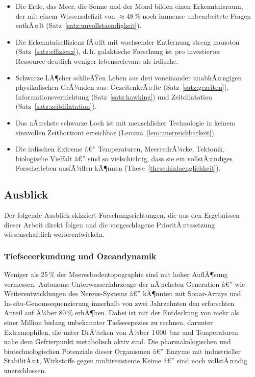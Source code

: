 ﻿\documentclass[a4paper,12pt]{article}
\theoremstyle{definition}
\begin{document}
\begin{itemize}
    \item Die Erde, das Meer, die Sonne und der Mond bilden einen Erkenntnisraum,
          der mit einem Wissensdefizit von $\approx 48\,\%$ noch immense
          unbearbeitete Fragen enthÃ¤lt (Satz~\ref{satz:unvollstaendigkeit}).
    \item Die Erkenntniseffizienz fÃ¤llt mit wachsender Entfernung streng monoton
          (Satz~\ref{satz:effizienz}), d.\,h. galaktische Forschung ist pro
          investierter Ressource deutlich weniger lebensrelevant als irdische.
    \item Schwarze LÃ¶cher schlieÃŸen Leben aus drei voneinander unabhÃ¤ngigen
          physikalischen GrÃ¼nden aus: GezeitenkrÃ¤fte (Satz~\ref{satz:gezeiten}),
          Informationsvernichtung (Satz~\ref{satz:hawking}) und Zeitdilatation
          (Satz~\ref{satz:zeitdilatation}).
    \item Das nÃ¤chste schwarze Loch ist mit menschlicher Technologie in keinem
          sinnvollen Zeithorizont erreichbar (Lemma~\ref{lem:unerreichbarkeit}).
    \item Die irdischen Extreme â€” Temperaturen, MeeresdrÃ¼cke, Tektonik,
          biologische Vielfalt â€” sind so vielschichtig, dass sie ein
          vollstÃ¤ndiges Forscherleben ausfÃ¼llen kÃ¶nnen
          (These~\ref{these:hinlaenglichkeit}).
\end{itemize}

\subsection{Ausblick}

Der folgende Ausblick skizziert Forschungsrichtungen, die aus den Ergebnissen
dieser Arbeit direkt folgen und die vorgeschlagene PrioritÃ¤tssetzung
wissenschaftlich weiterentwickeln.

\subsubsection{Tiefseeerkundung und Ozeandynamik}

Weniger als 25\,\% der Meeresbodentopographie sind mit hoher AuflÃ¶sung
vermessen. Autonome Unterwasserfahrzeuge der nÃ¤chsten Generation â€” wie
Weiterentwicklungen des Nereus-Systems â€” kÃ¶nnten mit Sonar-Arrays und
In-situ-Genomsequenzierung innerhalb von zwei Jahrzehnten den erforschten
Anteil auf Ã¼ber 80\,\% erhÃ¶hen. Dabei ist mit der Entdeckung von mehr als
einer Million bislang unbekannter Tiefseespezies zu rechnen, darunter
Extremophilen, die unter DrÃ¼cken von Ã¼ber 1\,000~bar und Temperaturen nahe
dem Gefrierpunkt metabolisch aktiv sind. Die pharmakologischen und
biotechnologischen Potenziale dieser Organismen â€” Enzyme mit industrieller
StabilitÃ¤t, Wirkstoffe gegen multiresistente Keime â€” sind noch vollstÃ¤ndig
unerschlossen.
\end{document}
